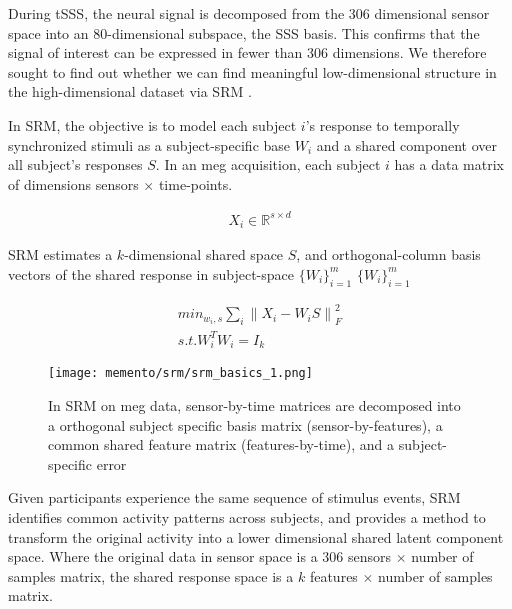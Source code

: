 During \gls{tSSS}, the neural signal is decomposed from the 306 dimensional sensor space into an 80-dimensional subspace, the \gls{SSS} basis.
This confirms that the signal of interest can be expressed in fewer than 306 dimensions.
We therefore sought to find out whether we can find meaningful low-dimensional structure in the high-dimensional dataset via \gls{SRM} \citep{NIPS2015_b3967a0e}.

In \gls{SRM}, the objective is to model each subject $i$'s response to temporally synchronized stimuli as a subject-specific base $W_i$ and a shared component over all subject's responses $S$.
In an \gls{meg} acquisition, each subject $i$ has a data matrix of dimensions sensors $\times$ time-points.


\begin{equation}
	\begin{aligned}
    X_i \in \mathbb{R}^{s \times d}
	\end{aligned}
	\label{eq:sss}
\end{equation}

\gls{SRM} estimates a $k$-dimensional shared space $S$, and orthogonal-column basis vectors of the shared response in subject-space  $\{W_i\}^m_{i=1}$  $\{W_i\}^m_{i=1}$


\begin{equation}
	\begin{aligned}
	    min_{w_i, s}\sum_i{\|X_i - W_iS \|}^2_F \\
	s.t. W^T_iW_i = I_k
	\end{aligned}
	\label{eq:sss}
\end{equation}


\begin{figure}
	\centering
	\texttt{[image: memento/srm/srm\_basics\_1.png]}
	\caption[SRM overview]{In \gls{SRM} on \gls{meg} data, sensor-by-time matrices are decomposed into a orthogonal subject specific basis matrix (sensor-by-features), a common shared feature matrix (features-by-time), and a subject-specific error}
	\label{fig:srm-basics}
\end{figure}

Given participants experience the same sequence of stimulus events, \gls{SRM} identifies common activity patterns across subjects, and provides a method to transform the original activity into a lower dimensional shared latent component space.
Where the original data in sensor space is a $306$ sensors $\times$ number of samples matrix, the shared response space is a $k$ features $\times$ number of samples matrix.


